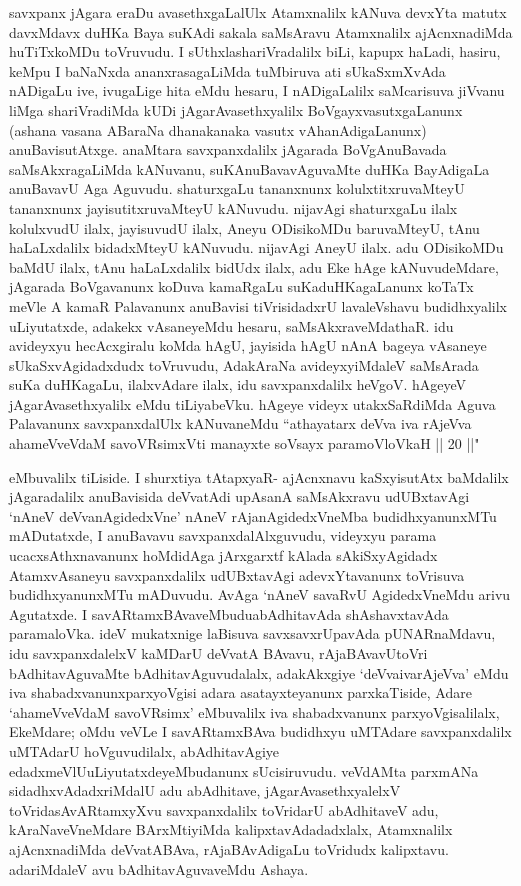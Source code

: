 \begin{artha}
savxpanx jAgara eraDu avasethxgaLalUlx Atamxnalilx kANuva devxYta matutx davxMdavx duHKa Baya suKAdi sakala saMsAravu Atamxnalilx ajAcnxnadiMda huTiTxkoMDu toVruvudu. I sUthxlashariVradalilx biLi, kapupx haLadi, hasiru, keMpu I baNaNxda ananxrasagaLiMda tuMbiruva ati sUkaSxmXvAda nADigaLu ive, ivugaLige hita eMdu hesaru, I nADigaLalilx saMcarisuva jiVvanu liMga shariVradiMda kUDi jAgarAvasethxyalilx BoVgayxvasutxgaLanunx (ashana vasana ABaraNa dhanakanaka vasutx vAhanAdigaLanunx) anuBavisutAtxge. anaMtara savxpanxdalilx jAgarada BoVgAnuBavada saMsAkxragaLiMda kANuvanu, suKAnuBavavAguvaMte duHKa BayAdigaLa anuBavavU Aga Aguvudu. shaturxgaLu tananxnunx kolulxtitxruvaMteyU tananxnunx jayisutitxruvaMteyU kANuvudu. nijavAgi shaturxgaLu ilalx kolulxvudU ilalx, jayisuvudU ilalx, Aneyu ODisikoMDu baruvaMteyU, tAnu haLaLxdalilx bidadxMteyU kANuvudu. nijavAgi AneyU ilalx. adu ODisikoMDu baMdU ilalx, tAnu haLaLxdalilx bidUdx ilalx, adu Eke hAge kANuvudeMdare, jAgarada BoVgavanunx koDuva kamaRgaLu suKaduHKagaLanunx koTaTx meVle A kamaR Palavanunx anuBavisi tiVrisidadxrU lavaleVshavu budidhxyalilx uLiyutatxde, adakekx vAsaneyeMdu hesaru, saMsAkxraveMdathaR. idu avideyxyu hecAcxgiralu koMda hAgU, jayisida hAgU nAnA bageya vAsaneye sUkaSxvAgidadxdudx toVruvudu, AdakAraNa avideyxyiMdaleV saMsArada suKa duHKagaLu, ilalxvAdare ilalx, idu savxpanxdalilx heVgoV. hAgeyeV jAgarAvasethxyalilx eMdu tiLiyabeVku. hAgeye videyx utakxSaRdiMda Aguva Palavanunx savxpanxdalUlx kANuvaneMdu ``athayatarx deVva iva rAjeVva ahameVveVdaM savoVR\s simxVti manayxte soV\s sayx paramoVloVkaH || 20 ||" 
\end{artha}%

\begin{artha}
eMbuvalilx tiLiside. I shurxtiya tAtapxyaR- ajAcnxnavu kaSxyisutAtx baMdalilx jAgaradalilx anuBavisida deVvatAdi upAsanA saMsAkxravu udUBxtavAgi `nAneV deVvanAgidedxVne' nAneV rAjanAgidedxVneMba budidhxyanunxMTu mADutatxde, I anuBavavu savxpanxdalAlxguvudu, videyxyu parama ucacxsAthxnavanunx hoMdidAga jArxgarxtf kAlada sAkiSxyAgidadx AtamxvAsaneyu savxpanxdalilx udUBxtavAgi adevxYtavanunx toVrisuva budidhxyanunxMTu mADuvudu. AvAga `nAneV savaRvU AgidedxVneMdu arivu Agutatxde. I savARtamxBAvaveMbudu\break abAdhitavAda shAshavxtavAda paramaloVka. ideV mukatxnige laBisuva savxsavxrUpavAda pUNARnaMdavu, idu savxpanxdalelxV kaMDarU deVvatA BAvavu, rAjaBAvavUtoVri bAdhitavAguvaMte bAdhitavAguvudalalx, adakAkxgiye `deVvaivarAjeVva' eMdu iva shabadxvanunx\break parxyoVgisi adara asatayxteyanunx parxkaTiside, Adare `ahameVveVdaM savoVRsimx' eMbuvalilx iva shabadxvanunx parxyoVgisalilalx, EkeMdare; oMdu veVLe I savARtamxBAva budidhxyu uMTAdare savxpanxdalilx uMTAdarU hoVguvudilalx, abAdhitavAgiye edadxmeVlU\break uLiyutatxdeyeMbudanunx sUcisiruvudu. veVdAMta parxmANa sidadhxvAdadxriMdalU adu abAdhitave, jAgarAvasethxyalelxV toVrida\break sAvARtamxyXvu savxpanxdalilx toVridarU abAdhitaveV adu, kAraNaveVneMdare BArxMtiyiMda kalipxtavAdadadxlalx, Atamxnalilx ajAcnxnadiMda deVvatABAva, rAjaBAvAdigaLu toVridudx kalipxtavu. adariMdaleV avu bAdhitavAguvaveMdu Ashaya. 
\end{artha}

